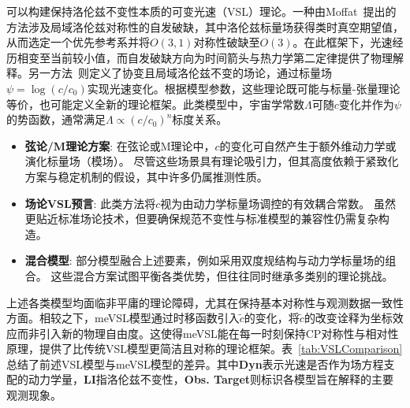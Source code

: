 \documentclass[jkps,preprint,fleqn]{revtex4}
\newcommand{\tc}{\tilde{c}}
\begin{document}
\begin{CJK*}{UTF8}{gbsn}
\begin{itemize}
\end{itemize}
可以构建保持洛伦兹不变性本质的可变光速（VSL）理论。一种由Moffat~\cite{Moffat:1992ud}提出的方法涉及局域洛伦兹对称性的自发破缺，其中洛伦兹标量场获得类时真空期望值，从而选定一个优先参考系并将$O(3,1)$对称性破缺至$O(3)$。在此框架下，光速经历相变至当前较小值，而自发破缺方向为时间箭头与热力学第二定律提供了物理解释。另一方法~\cite{Magueijo:2000zt}则定义了协变且局域洛伦兹不变的场论，通过标量场$\psi = \log(c/c_0)$实现光速变化。根据模型参数，这些理论既可能与标量-张量理论等价，也可能定义全新的理论框架。此类模型中，宇宙学常数$\Lambda$可随$c$变化并作为$\psi$的势函数，通常满足$\Lambda \propto (c/c_0)^n$标度关系\cite{Manida:1999rx,Barrow:1999st,Stepanov:1999ax,Magueijo:2000au,Moffat:2002nm}。

\begin{itemize}
  \item \textbf{弦论/M理论方案}:
    在弦论或M理论中，$c$的变化可自然产生于额外维动力学或演化标量场（模场）\cite{Kaelbermann:1998hu,Randall:1999ee,Randall:1999vf,Kiritsis:1999tx,Chung:1999xg,Alexander:1999cb,Ishihara:2000nf,Csaki:2000dm,Youm:2001sw,Youm:2001zk,Grojean:2001pv,Youm:2001zp}。
    尽管这些场景具有理论吸引力，但其高度依赖于紧致化方案与稳定机制的假设，其中许多仍属推测性质。
   \item \textbf{场论VSL预言}:
    此类方法将$c$视为由动力学标量场调控的有效耦合常数\cite{Drummond:1979pp,Novello:1988ma,Barton:1989dq,Scharnhorst:1990sr,Shore:1995fz,Colladay:1995qb,Coleman:1998ti,Bertolami:1999da,Shore:2000bs,Greenberg:2002uu,Teyssandier:2003qh,Shore:2003zc,Blasone:2003wf}。
    虽然更贴近标准场论技术，但要确保规范不变性与标准模型的兼容性仍需复杂构造。
    \item \textbf{混合模型}:
    部分模型融合上述要素，例如采用双度规结构与动力学标量场的组合\cite{Alexander:2001dr,Burgess:2002tb}。
    这些混合方案试图平衡各类优势，但往往同时继承多类别的理论挑战。
\end{itemize}

上述各类模型均面临非平庸的理论障碍，尤其在保持基本对称性与观测数据一致性方面。相较之下，meVSL模型通过时移函数引入$\tc$的变化，将$\tc$的改变诠释为坐标效应而非引入新的物理自由度。这使得meVSL能在每一时刻保持CP对称性与相对性原理，提供了比传统VSL模型更简洁且对称的理论框架。表~\ref{tab:VSLComparison}总结了前述VSL模型与meVSL模型的差异。其中\textbf{Dyn}表示光速是否作为场方程支配的动力学量，\textbf{LI}指洛伦兹不变性，\textbf{Obs. Target}则标识各模型旨在解释的主要观测现象。

\end{CJK*}
\end{document}
